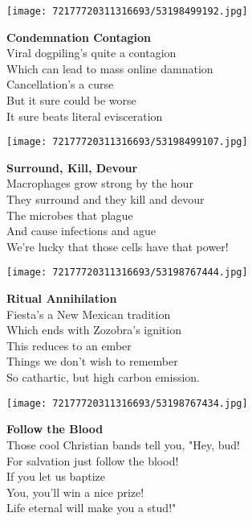 \documentclass[10pt,letterpaper]{article}
\begin{document}
\pagebreak
\begin{center}
\texttt{[image: 72177720311316693/53198499192.jpg]}
\end{center}

\begin{center}
\textbf{Condemnation Contagion}\\
\vskip 0.2in
Viral dogpiling's quite a contagion\\
Which can lead to mass online damnation\\
Cancellation's a curse\\
But it sure could be worse\\
It sure beats literal evisceration\\
\end{center}
\pagebreak

\begin{center}\texttt{[image: 72177720311316693/53198499107.jpg]}
\end{center}
\begin{center}
\textbf{Surround, Kill, Devour}\\
\vskip 0.2in
Macrophages grow strong by the hour\\
They surround and they kill and devour\\
The microbes that plague\\
And cause infections and ague\\
We're lucky that those cells have that power!\\
\end{center}
\pagebreak

\begin{center}\texttt{[image: 72177720311316693/53198767444.jpg]}
\end{center}
\begin{center}
\textbf{Ritual Annihilation}\\
\vskip 0.2in
Fiesta's a New Mexican tradition\\
Which ends with Zozobra's ignition\\
This reduces to an ember\\
Things we don't wish to remember\\
So cathartic, but high carbon emission.\\
\end{center}
\pagebreak

\begin{center}\texttt{[image: 72177720311316693/53198767434.jpg]}
\end{center}
\begin{center}
\textbf{Follow the Blood}\\
\vskip 0.2in
Those cool Christian bands tell you, "Hey, bud!\\
For salvation just follow the blood!\\
If you let us baptize\\
You, you'll win a nice prize!\\
Life eternal will make you a stud!"\\
\end{center}
\pagebreak
\end{document}
